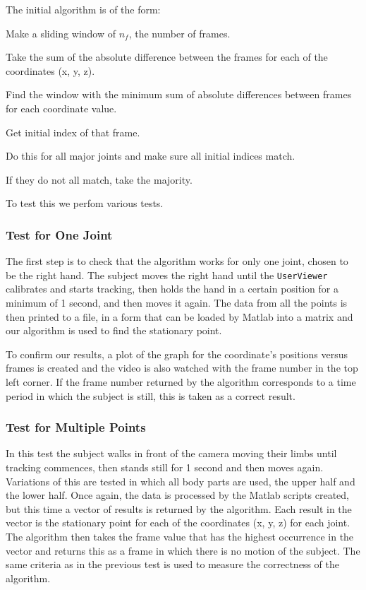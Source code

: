 \documentclass[11pt,a4paper]{article}
\begin{document}
\noindent
The initial algorithm is of the form:
\begin{compactitem}
\setlength{\itemsep}{1pt}
\setlength{\parskip}{0pt}
\setlength{\parsep}{0pt}
	\item Make a sliding window of $n_{f}$, the number of frames.
	\item Take the sum of the absolute difference between the frames for each of the coordinates (x, y, z).
	\item Find the window with the minimum sum of absolute differences between frames for each coordinate value.
	\item Get initial index of that frame.
\item Do this for all major joints and make sure all initial indices match.
\item If they do not all match, take the majority. 
\end{compactitem}
\noindent
To test this we perfom various tests.

\subsubsection{Test for One Joint}
The first step is to check that the algorithm works for only one joint, chosen to be the right hand. The subject moves the right hand until the \texttt{UserViewer} calibrates and starts tracking, then holds the hand in a certain position for a minimum of 1 second, and then moves it again. The data from all the points is then printed to a file, in a form that can be loaded by Matlab into a matrix and our algorithm is used to find the stationary point.  

\noindent
To confirm our results, a plot of the graph for the coordinate's positions versus frames is created and the video is also watched with the frame number in the top left corner. If the frame number returned by the algorithm corresponds to a time period in which the subject is still, this is taken as a correct result. 
\subsubsection{Test for Multiple Points}
\noindent 
In this test the subject walks in front of the camera moving their limbs until tracking commences, then stands still for 1 second and then moves again. Variations of this are tested in which all body parts are used, the upper half and the lower half. Once again, the data is processed by the Matlab scripts created, but this time a vector of results is returned by the algorithm. Each result in the vector is the stationary point for each of the coordinates (x, y, z) for each joint. The algorithm then takes the frame value that has the highest occurrence in the vector and returns this as a frame in which there is no motion of the subject. The same criteria as in the previous test is used to measure the correctness of the algorithm. 
\end{document}
